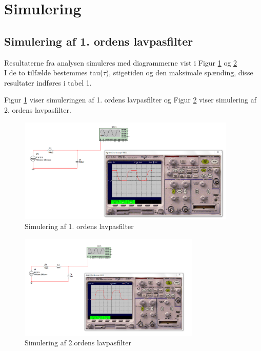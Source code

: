 \section{Simulering}

\subsection{Simulering af 1. ordens lavpasfilter}
Resultaterne fra analysen simuleres med diagrammerne vist i Figur \ref{1.orden} og \ref{2orden}
\\
I de to tilfælde bestemmes tau($\tau$), stigetiden og den maksimale spænding, disse resultater indføres i tabel 1.

Figur \ref{1.orden} viser simuleringen af 1. ordens lavpasfilter og Figur \ref{2orden} viser simulering af 2. ordens lavpasfilter.

\begin{figure}[h!]
 \begin{center}
  \includegraphics[height=5cm]{P_Fig/figur1.png}
  \caption{Simulering af 1. ordens lavpasfilter}
  \label{1.orden}
 \end{center}
\end{figure}

\begin{figure}[h]
 \begin{center}
  \includegraphics[height=5cm]{P_Fig/figur12_2orden}
  \caption{Simulering af 2.ordens lavpasfilter}
  \label{2orden}
 \end{center}
\end{figure}


